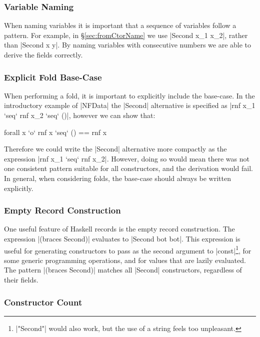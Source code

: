\documentclass{llncs}
\begin{document}

\subsubsection{Variable Naming}

When naming variables it is important that a sequence of variables follow a pattern. For example, in \S\ref{sec:fromCtorName} we use |Second x_1 x_2|, rather than |Second x y|. By naming variables with consecutive numbers we are able to derive the fields correctly.

\subsubsection{Explicit Fold Base-Case}

When performing a fold, it is important to explicitly include the base-case. In the introductory example of |NFData| the |Second| alternative is specified as |rnf x_1 `seq` rnf x_2 `seq` ()|, however we can show that:

\ignore\begin{code}
forall x `o` rnf x `seq` () == rnf x
\end{code}

Therefore we could write the |Second| alternative more compactly as the expression |rnf x_1 `seq` rnf x_2|. However, doing so would mean there was not one consistent pattern suitable for all constructors, and the derivation would fail. In general, when considering folds, the base-case should always be written explicitly.

\subsubsection{Empty Record Construction}

One useful feature of Haskell records is the empty record construction. The expression |(braces Second)| evaluates to |Second bot bot|. This expression is useful for generating constructors to pass as the second argument to |const|\footnote{|"Second"| would also work, but the use of a string feels too unpleasant.}, for some generic programming operations, and for values that are lazily evaluated. The pattern |(braces Second)| matches all |Second| constructors, regardless of their fields.

\subsubsection{Constructor Count}
\end{document}
